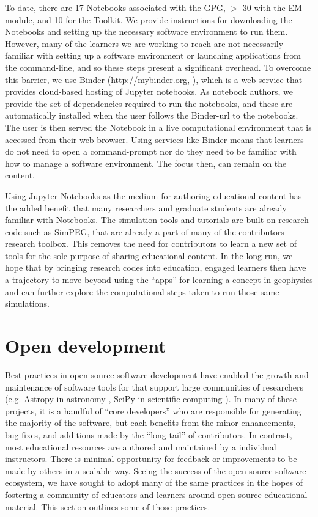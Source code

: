 To date, there are 17 Notebooks associated with the GPG, $>$ 30 with the EM module, and 10 for the Toolkit. We provide instructions for downloading the Notebooks and setting up the necessary software environment to run them. However, many of the learners we are working to reach are not necessarily familiar with setting up a software environment or launching applications from the command-line, and so these steps present a significant overhead. To overcome this barrier, we use Binder (\href{http://mybinder.org}{http://mybinder.org}, \cite{ProjectJupyter2018}), which is a web-service that provides cloud-based hosting of Jupyter notebooks. As notebook authors, we provide the set of dependencies required to run the notebooks, and these are automatically installed when the user follows the Binder-url to the notebooks. The user is then served the Notebook in a live computational environment that is accessed from their web-browser. Using services like Binder means that learners do not need to open a command-prompt nor do they need to be familiar with how to manage a software environment. The focus then, can remain on the content.

Using Jupyter Notebooks as the medium for authoring educational content has the added benefit that many researchers and graduate students are already familiar with Notebooks. The simulation tools and tutorials are built on research code such as SimPEG, that are already a part of many of the contributors research toolbox. This removes the need for contributors to learn a new set of tools for the sole purpose of sharing educational content. In the long-run, we hope that by bringing research codes into education, engaged learners then have a trajectory to move beyond using the ``apps'' for learning a concept in geophysics and can further explore the computational steps taken to run those same simulations.
\section{Open development}
\label{sec:open-development}

Best practices in open-source software development have enabled the growth and maintenance of software tools for that support large communities of researchers (e.g. Astropy in astronomy \citep{Astropy2013}, SciPy in scientific computing \cite{scipy}). In many of these projects, it is a handful of ``core developers'' who are responsible for generating the majority of the software, but each benefits from the minor enhancements, bug-fixes, and additions made by the ``long tail'' of contributors. In contrast, most educational resources are authored and maintained by a individual instructors. There is minimal opportunity for feedback or improvements to be made by others in a scalable way. Seeing the success of the open-source software ecosystem, we have sought to adopt many of the same practices in the hopes of fostering a community of educators and learners around open-source educational material. This section outlines some of those practices.


